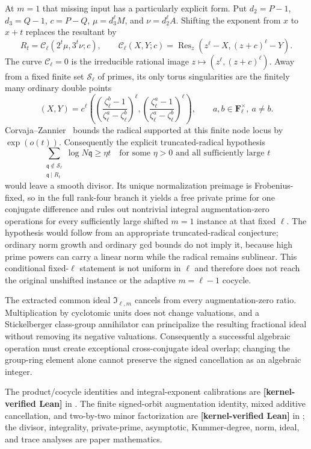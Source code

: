 \documentclass[11pt,oneside]{article}
\theoremstyle{definition}
\theoremstyle{remark}
\newcommand{\lean}[1]{\texttt{\detokenize{#1}}}
\newcommand{\statuslean}{\textcolor{leanblue}{\textbf{[kernel-verified Lean]}}}
\begin{document}
At $m=1$ that missing input has a particularly explicit form.  Put
$d_2=P-1$, $d_3=Q-1$, $c=P-Q$, $\mu=d_3^\ell M$, and
$\nu=d_2^\ell A$.  Shifting the exponent from $x$ to $x+t$ replaces the resultant by
\[
 R_t=\mathcal C_\ell(2^t\mu,3^t\nu;c),\qquad
 \mathcal C_\ell(X,Y;c)
 =\operatorname{Res}_z(z^\ell-X,(z+c)^\ell-Y).
\]
The curve $\mathcal C_\ell=0$ is the irreducible rational image
$z\mapsto(z^\ell,(z+c)^\ell)$.  Away from a fixed finite set $\mathcal S_\ell$ of primes,
its only torus singularities are the finitely many ordinary double points
\[
 (X,Y)=c^\ell\left(
  \left(\frac{\zeta_\ell^b-1}{\zeta_\ell^a-\zeta_\ell^b}\right)^\ell,
  \left(\frac{\zeta_\ell^a-1}{\zeta_\ell^a-\zeta_\ell^b}\right)^\ell
 \right),\qquad a,b\in\mathbf F_\ell^\times,\ a\ne b.
\]
Corvaja--Zannier~\cite{CorvajaZannier2005} bounds the radical supported at this finite node
locus by $\exp(o(t))$.
Consequently the explicit truncated-radical hypothesis
\begin{equation}
 \sum_{\substack{\mathfrak q\notin\mathcal S_\ell\\ \mathfrak q\mid R_t}}
 \log N\mathfrak q\ge\eta t
 \quad\text{for some $\eta>0$ and all sufficiently large $t$}
 \label{crit:eq-private-prime-truncated}
\end{equation}
would leave a smooth divisor.  Its unique normalization preimage is Frobenius-fixed, so in
the full rank-four branch it yields a free private prime for one conjugate difference and
rules out nontrivial integral augmentation-zero operations for every sufficiently large
shifted $m=1$ instance at that fixed $\ell$.  The hypothesis would follow from an appropriate
truncated-radical conjecture; ordinary norm growth and ordinary gcd bounds do not imply it,
because high prime powers can carry a linear norm while the radical remains sublinear.  This
conditional fixed-$\ell$ statement is not uniform in $\ell$ and therefore does not reach the
original unshifted instance or the adaptive $m=\ell-1$ cocycle.

The extracted common ideal $\mathfrak I_{\ell,m}$ cancels from every
augmentation-zero ratio.  Multiplication by
cyclotomic units does not change valuations, and a Stickelberger class-group annihilator
can principalize the resulting fractional ideal without removing its negative valuations.
Consequently a successful algebraic operation must create exceptional cross-conjugate ideal
overlap; changing the group-ring element alone cannot preserve the signed cancellation as an
algebraic integer.

The product/cocycle identities and integral-exponent calibrations are \statuslean{} in
\lean{RankOneNewtonKummer}.  The finite signed-orbit augmentation identity, mixed additive
cancellation, and two-by-two minor factorization are \statuslean{} in
\lean{SignedOrbitNormFinite}; the divisor, integrality, private-prime, asymptotic,
Kummer-degree, norm, ideal, and trace analyses are paper mathematics.
\end{document}
